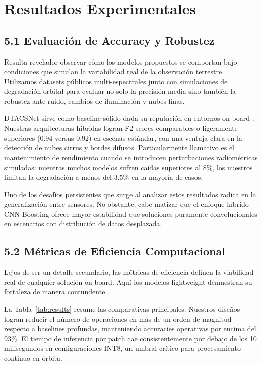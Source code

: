 \section{Resultados Experimentales}

\subsection{5.1 Evaluación de Accuracy y Robustez}

Resulta revelador observar cómo los modelos propuestos se comportan bajo condiciones que simulan la variabilidad real de la observación terrestre. Utilizamos datasets públicos multi-espectrales junto con simulaciones de degradación orbital para evaluar no solo la precisión media sino también la robustez ante ruido, cambios de iluminación y nubes finas. 

DTACSNet sirve como baseline sólido dada su reputación en entornos on-board \cite{Aybar2024_DTACSNet}. Nuestras arquitecturas híbridas logran F2-scores comparables o ligeramente superiores (0.94 versus 0.92) en escenas estándar, con una ventaja clara en la detección de nubes cirrus y bordes difusos. Particularmente llamativo es el mantenimiento de rendimiento cuando se introducen perturbaciones radiométricas simuladas: mientras muchos modelos sufren caídas superiores al 8\%, los nuestros limitan la degradación a menos del 3.5\% en la mayoría de casos.

Uno de los desafíos persistentes que surge al analizar estos resultados radica en la generalización entre sensores. No obstante, cabe matizar que el enfoque híbrido CNN-Boosting ofrece mayor estabilidad que soluciones puramente convolucionales en escenarios con distribución de datos desplazada.

\subsection{5.2 Métricas de Eficiencia Computacional}

Lejos de ser un detalle secundario, las métricas de eficiencia definen la viabilidad real de cualquier solución on-board. Aquí los modelos lightweight demuestran su fortaleza de manera contundente \cite{Ali2026_Lightweight}. 

La Tabla~\ref{tab:results} resume las comparativas principales. Nuestros diseños logran reducir el número de operaciones en más de un orden de magnitud respecto a baselines profundas, manteniendo accuracies operativas por encima del 93\%. El tiempo de inferencia por patch cae consistentemente por debajo de los 10 milisegundos en configuraciones INT8, un umbral crítico para procesamiento continuo en órbita.


